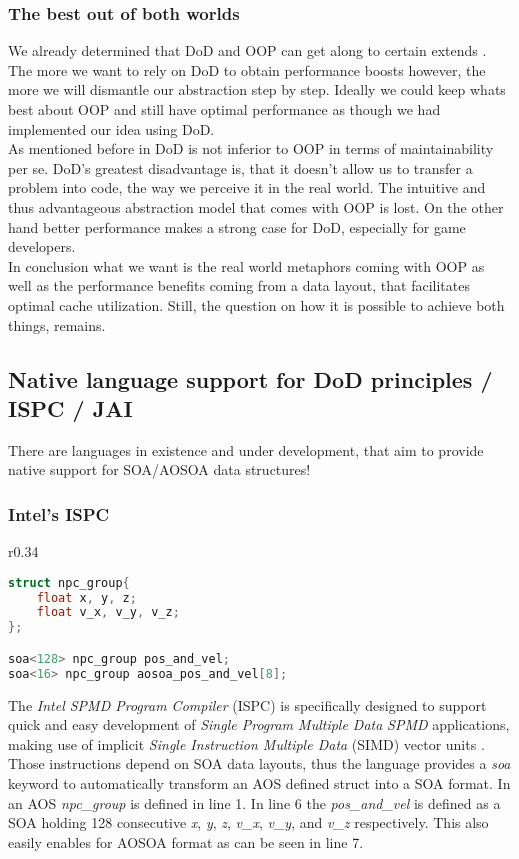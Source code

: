 \subsubsection{The best out of both worlds}
We already determined that DoD and OOP can get along to certain extends . The more we want to rely on DoD to obtain performance boosts however, the more we will dismantle our abstraction step by step. Ideally we could keep whats best about OOP and still have optimal performance as though we had implemented our idea using DoD.\\
As mentioned before in  DoD is not inferior to OOP in terms of maintainability per se. DoD's greatest disadvantage is, that it doesn't allow us to transfer a problem into code, the way we perceive it in the real world. The intuitive and thus advantageous abstraction model that comes with OOP is lost. On the other hand better performance makes a strong case for DoD, especially for game developers.\\
In conclusion what we want is the real world metaphors coming with OOP as well as the performance benefits coming from a data layout, that facilitates optimal cache utilization. Still, the question on how it is possible to achieve both things, remains.

\subsection{Native language support for DoD principles / ISPC / JAI}\label{nat_lan_sup}
There are languages in existence and under development, that aim to provide native support for SOA/AOSOA data structures!

\subsubsection{Intel's ISPC}
\begin{wrapfigure}[11]{r}{0.34\textwidth}
\vspace{-0.8cm}
\begin{lstlisting}[language=C++,name={ISPC's native SOA support},morekeywords={soa}, label={ispc_npc}]
struct npc_group{
	float x, y, z;
	float v_x, v_y, v_z;
};

soa<128> npc_group pos_and_vel;
soa<16> npc_group aosoa_pos_and_vel[8];
\end{lstlisting}
\end{wrapfigure}
The \textit{Intel SPMD Program Compiler} (ISPC) is specifically designed to support quick and easy development of \textit{Single Program Multiple Data} \textit{SPMD} applications, making use of implicit \textit{Single Instruction Multiple Data} (SIMD) vector units .\\
Those instructions depend on SOA data layouts, thus the language provides a \textit{soa} keyword to automatically transform an AOS defined struct into a SOA format. In  an AOS \textit{npc\_group} is defined in line 1. In line 6 the \textit{pos\_and\_vel} is defined as a SOA holding 128 consecutive \textit{x}, \textit{y}, \textit{z}, \textit{v\_x}, \textit{v\_y}, and \textit{v\_z} respectively. This also easily enables for AOSOA format as can be seen in line 7.


